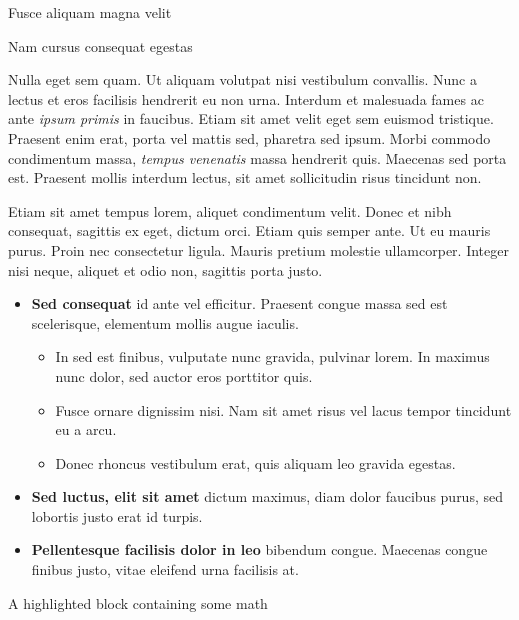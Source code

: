 \documentclass[final]{beamer}
\newlength{\colwidth}
\begin{document}
\begin{frame}[t,fragile]
\begin{columns}[t]
\begin{column}{\colwidth}
\begin{block}{Fusce aliquam magna velit}
  \end{block}

  \begin{block}{Nam cursus consequat egestas}

    Nulla eget sem quam. Ut aliquam volutpat nisi vestibulum convallis. Nunc a
    lectus et eros facilisis hendrerit eu non urna. Interdum et malesuada fames
    ac ante \textit{ipsum primis} in faucibus. Etiam sit amet velit eget sem
    euismod tristique. Praesent enim erat, porta vel mattis sed, pharetra sed
    ipsum. Morbi commodo condimentum massa, \textit{tempus venenatis} massa
    hendrerit quis. Maecenas sed porta est. Praesent mollis interdum lectus,
    sit amet sollicitudin risus tincidunt non.

    Etiam sit amet tempus lorem, aliquet condimentum velit. Donec et nibh
    consequat, sagittis ex eget, dictum orci. Etiam quis semper ante. Ut eu
    mauris purus. Proin nec consectetur ligula. Mauris pretium molestie
    ullamcorper. Integer nisi neque, aliquet et odio non, sagittis porta justo.

    \begin{itemize}
      \item \textbf{Sed consequat} id ante vel efficitur. Praesent congue massa
        sed est scelerisque, elementum mollis augue iaculis.
        \begin{itemize}
          \item In sed est finibus, vulputate
            nunc gravida, pulvinar lorem. In maximus nunc dolor, sed auctor eros
            porttitor quis.
          \item Fusce ornare dignissim nisi. Nam sit amet risus vel lacus
            tempor tincidunt eu a arcu.
          \item Donec rhoncus vestibulum erat, quis aliquam leo
            gravida egestas.
        \end{itemize}
      \item \textbf{Sed luctus, elit sit amet} dictum maximus, diam dolor
        faucibus purus, sed lobortis justo erat id turpis.
      \item \textbf{Pellentesque facilisis dolor in leo} bibendum congue.
        Maecenas congue finibus justo, vitae eleifend urna facilisis at.
    \end{itemize}

  \end{block}

  
  \begin{exampleblock}{A highlighted block containing some math}


\end{exampleblock}
\end{column}
\end{columns}
\end{frame}
\end{document}
